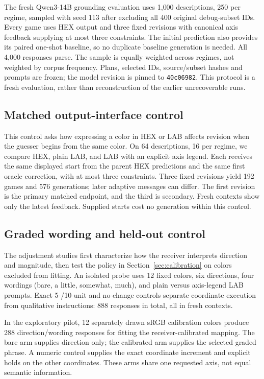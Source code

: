 \documentclass[11pt]{article}
\begin{document}
The fresh Qwen3-14B grounding evaluation uses 1{,}000 descriptions, 250 per
regime, sampled with seed 113 after excluding all 400 original debug-subset
IDs. Every game uses HEX output and three fixed revisions with canonical
axis feedback supplying at most three constraints. The initial prediction
also provides its paired one-shot baseline, so no duplicate baseline
generation is needed. All 4{,}000 responses parse.
The sample is equally weighted across regimes, not weighted by corpus
frequency. Plans, selected IDs, source/subset hashes and prompts are frozen;
the model revision is pinned to \texttt{40c06982}. This protocol is a fresh
evaluation, rather than reconstruction of the earlier unrecoverable runs.

\subsection{Matched output-interface control}
\label{sec:setup_interface}
This control asks how expressing a color in HEX or LAB affects revision
when the guesser begins from the same color. On 64 descriptions, 16 per
regime, we compare HEX, plain LAB, and LAB with an
explicit axis legend. Each receives the same displayed start from the parent
HEX predictions and the same first oracle correction, with at most three
constraints. Three fixed revisions yield 192 games and 576 generations;
later adaptive messages can differ. The first revision is the primary
matched endpoint, and the third is secondary. Fresh contexts show only the
latest feedback. Supplied starts cost no generation within this control.

\subsection{Graded wording and held-out control}
\label{sec:setup_magnitude}
The adjustment studies first characterize how the receiver interprets
direction and magnitude, then test the policy in Section~\ref{sec:calibration}
on colors excluded from fitting. An isolated probe uses 12 fixed colors,
six directions, four wordings
(bare, a little, somewhat, much), and plain versus axis-legend LAB prompts.
Exact 5-/10-unit and no-change controls separate coordinate execution from
qualitative instructions: 888 responses in total, all in fresh contexts.

In the exploratory pilot, 12 separately drawn sRGB calibration colors produce
288 direction/wording responses for fitting the receiver-calibrated mapping.
The bare arm supplies direction only; the calibrated arm supplies the
selected graded phrase. A numeric control supplies the exact
coordinate increment and explicit holds on the other coordinates.
These arms share one requested axis, not equal semantic information.
\end{document}

